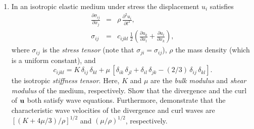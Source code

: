 {\begin{enumerate}
\item In an isotropic elastic medium under stress the displacement $u_i$ satisfies
\begin{eqnarray}
\frac{\partial\sigma_{ij}}{\partial x_j} &=&\rho\,\frac{\partial^2 u_i}{\partial t^2},\nonumber\\[0.5ex]
\sigma_{ij} &=&c_{ijkl}\,\frac{1}{2}\!\left(\frac{\partial u_k}{\partial x_l}+ \frac{\partial u_l}{\partial x_k}\right),\nonumber
\end{eqnarray}
where $\sigma_{ij}$ is the {\em stress tensor}\/ (note that $\sigma_{ji}=\sigma_{ij}$), $\rho$  the mass density
(which is a uniform constant), and 
$$
c_{ijkl} =  K\,\delta_{ij}\,\delta_{kl} + \mu\,[\delta_{ik}\,\delta_{jl}+\delta_{il}\,\delta_{jk} - (2/3)\,\delta_{ij}\,\delta_{kl}].
$$
the isotropic {\em stiffness tensor}.
Here, $K$ and $\mu$ are the {\em bulk modulus}\/ and {\em shear modulus}\/ of the medium, respectively.
Show that the divergence and the curl of ${\bf u}$ both satisfy wave equations. Furthermore, demonstrate that
the characteristic wave velocities of the divergence and curl waves are $[(K+4\mu/3)/\rho]^{1/2}$ and
$(\mu/\rho)^{1/2}$, respectively.

\end{enumerate}}
